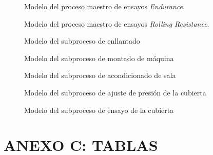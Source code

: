 \begin{figure}[H]
	\begin{center}
		
	\end{center}
	\caption{Modelo del proceso maestro de ensayos \textit{Endurance}.}
\end{figure}

\begin{figure}[H]
	\begin{center}
		
	\end{center}
	\caption{Modelo del proceso maestro de ensayos \textit{Rolling Resistance}.}
\end{figure}

\begin{figure}[H]
	\begin{center}
		
	\end{center}
	\caption{Modelo del subproceso de enllantado}
\end{figure}

\begin{figure}[H]
	\begin{center}
		
	\end{center}
	\caption{Modelo del subproceso de montado de máquina}
\end{figure}

\begin{figure}[H]
	\begin{center}
		
	\end{center}
	\caption{Modelo del subproceso de acondicionado de sala}
\end{figure}

\begin{figure}[H]
	\begin{center}
		
	\end{center}
	\caption{Modelo del subproceso de ajuste de presión de la cubierta}
\end{figure}

\begin{figure}[H]
	\begin{center}
		
	\end{center}
	\caption{Modelo del subproceso de ensayo de la cubierta}
\end{figure}

\section{ANEXO C: TABLAS}\label{apnd4}

